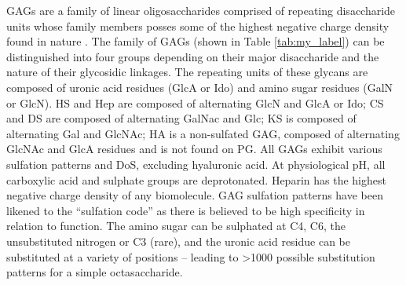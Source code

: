 \documentclass[journal=jctcce,manuscript=article]{achemso}
\begin{document}
{\Acp{GAG} are a family of linear oligosaccharides comprised of repeating disaccharide units whose family members posses some of the highest negative charge density found in nature \cite{Gandhi2008TheProteins,Swarup2013SugarNeurons}. The family of \acp{GAG} (shown in Table \ref{tab:my_label}) can be distinguished into four groups depending on their major disaccharide and the nature of their glycosidic linkages. 
The repeating units of these glycans are composed of uronic acid residues (\ac{GlcA} or \ac{Ido}) and amino sugar residues (\ac{GalN} or \ac{GlcN}). \ac{HS} and \ac{Hep} are composed of alternating \ac{GlcN} and \ac{GlcA} or \ac{Ido}; \ac{CS} and \ac{DS} are composed of alternating \ac{GalNac} and \ac{Glc}; \ac{KS} is composed of alternating \ac{Gal} and \ac{GlcNAc}; \ac{HA} is a non-sulfated \ac{GAG}, composed of alternating \ac{GlcNAc} and \ac{GlcA} residues and is not found on \ac{PG}. All \acp{GAG} exhibit various sulfation patterns and \acf{DoS}, excluding hyaluronic acid. At physiological pH, all carboxylic acid and sulphate groups are deprotonated. Heparin has the highest negative charge density of any biomolecule. GAG sulfation patterns have been likened to the “sulfation code” as there is believed to be high specificity in relation to function.\cite{Habuchi2004SulfationCode, Gama2006SulfationActivity} The amino sugar can be sulphated at C4, C6, the unsubstituted nitrogen or C3 (rare), and the uronic acid residue can be substituted at a variety of positions – leading to \textgreater1000 possible substitution patterns for a simple octasaccharide.\cite{Gandhi2008TheProteins, SoaresdaCosta2017SulfationDisorders}


}
\end{document}
